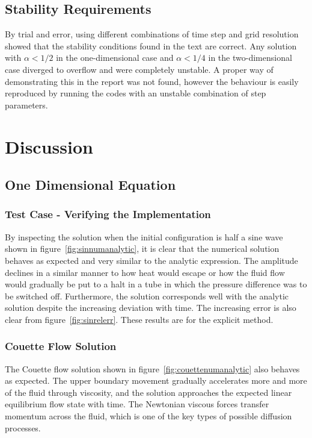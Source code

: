\documentclass[aps,reprint]{revtex4-1}
\begin{document}
\subsection{Stability Requirements}
By trial and error, using different combinations of time step and grid resolution
showed that the stability conditions found in the text are correct. Any solution
with $\alpha < 1/2$ in the one-dimensional case and $\alpha < 1/4$ in the two-dimensional case
diverged to overflow and were completely unstable. A proper way of demonstrating
this in the report was not found, however the behaviour is easily reproduced by
running the codes with an unstable combination of step parameters.
\section{Discussion} \label{sec:discussion}
\subsection{One Dimensional Equation}
\subsubsection{Test Case - Verifying the Implementation}
By inspecting the solution when the initial configuration is half a sine wave
shown in figure~\ref{fig:sinnumanalytic}, it is clear that the numerical solution
behaves as expected and very similar to the analytic expression. The amplitude
declines in a similar manner to how heat would escape or how the fluid flow would
gradually be put to a halt in a tube in which the pressure difference was to be
switched off. Furthermore, the solution corresponds well with the analytic solution
despite the increasing deviation with time. The increasing error is also clear from
figure~\ref{fig:sinrelerr}. These results are for the explicit method.
\subsubsection{Couette Flow Solution}
The Couette flow solution shown in figure~\ref{fig:couettenumanalytic} also behaves
as expected. The upper boundary movement gradually accelerates more and more of the fluid through
viscosity, and the solution approaches the expected linear equilibrium flow state
with time. The Newtonian viscous forces transfer momentum across the fluid, which
is one of the key types of possible diffusion processes.
\end{document}

